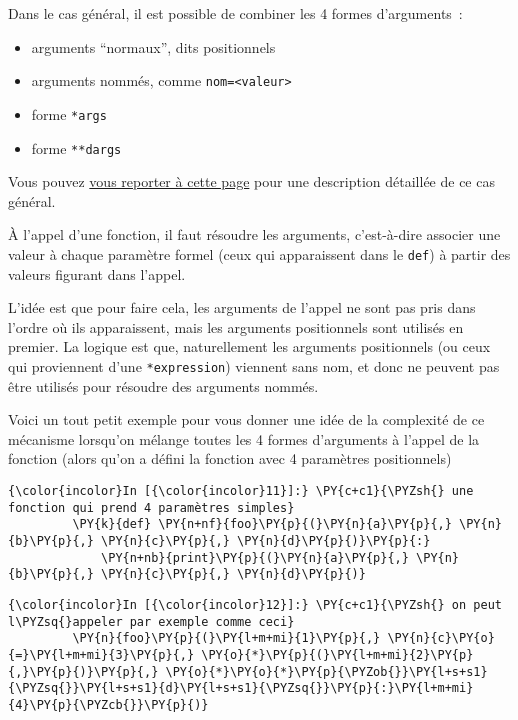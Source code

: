Dans le cas général, il est possible de combiner les 4 formes
d'arguments~:

\begin{itemize}
\tightlist
\item
  arguments ``normaux'', dits positionnels
\item
  arguments nommés, comme \texttt{nom=\textless{}valeur\textgreater{}}
\item
  forme \texttt{*args}
\item
  forme \texttt{**dargs}
\end{itemize}

Vous pouvez
\href{https://docs.python.org/3/reference/expressions.html\#calls}{vous
reporter à cette page} pour une description détaillée de ce cas général.

    À l'appel d'une fonction, il faut résoudre les arguments, c'est-à-dire
associer une valeur à chaque paramètre formel (ceux qui apparaissent
dans le \texttt{def}) à partir des valeurs figurant dans l'appel.

L'idée est que pour faire cela, les arguments de l'appel ne sont pas
pris dans l'ordre où ils apparaissent, mais les arguments positionnels
sont utilisés en premier. La logique est que, naturellement les
arguments positionnels (ou ceux qui proviennent d'une
\texttt{*expression}) viennent sans nom, et donc ne peuvent pas être
utilisés pour résoudre des arguments nommés.

    Voici un tout petit exemple pour vous donner une idée de la complexité
de ce mécanisme lorsqu'on mélange toutes les 4 formes d'arguments à
l'appel de la fonction (alors qu'on a défini la fonction avec 4
paramètres positionnels)

    \begin{Verbatim}[commandchars=\\\{\}]
{\color{incolor}In [{\color{incolor}11}]:} \PY{c+c1}{\PYZsh{} une fonction qui prend 4 paramètres simples}
         \PY{k}{def} \PY{n+nf}{foo}\PY{p}{(}\PY{n}{a}\PY{p}{,} \PY{n}{b}\PY{p}{,} \PY{n}{c}\PY{p}{,} \PY{n}{d}\PY{p}{)}\PY{p}{:}
             \PY{n+nb}{print}\PY{p}{(}\PY{n}{a}\PY{p}{,} \PY{n}{b}\PY{p}{,} \PY{n}{c}\PY{p}{,} \PY{n}{d}\PY{p}{)}
\end{Verbatim}


    \begin{Verbatim}[commandchars=\\\{\}]
{\color{incolor}In [{\color{incolor}12}]:} \PY{c+c1}{\PYZsh{} on peut l\PYZsq{}appeler par exemple comme ceci}
         \PY{n}{foo}\PY{p}{(}\PY{l+m+mi}{1}\PY{p}{,} \PY{n}{c}\PY{o}{=}\PY{l+m+mi}{3}\PY{p}{,} \PY{o}{*}\PY{p}{(}\PY{l+m+mi}{2}\PY{p}{,}\PY{p}{)}\PY{p}{,} \PY{o}{*}\PY{o}{*}\PY{p}{\PYZob{}}\PY{l+s+s1}{\PYZsq{}}\PY{l+s+s1}{d}\PY{l+s+s1}{\PYZsq{}}\PY{p}{:}\PY{l+m+mi}{4}\PY{p}{\PYZcb{}}\PY{p}{)}
\end{Verbatim}


